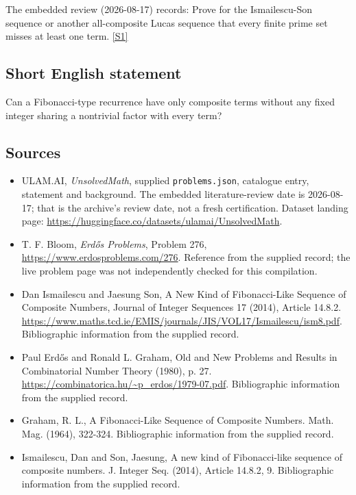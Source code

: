 \documentclass[11pt,a4paper]{article}
\newcommand{\sref}[2]{\hyperlink{source:#1:#2}{[S#2]}}
\begin{document}
The embedded review (2026-08-17) records: Prove for the Ismailescu-Son sequence or another all-composite Lucas sequence that every finite prime set misses at least one term. \sref{statement}{1}

\subsection{Short English statement}

Can a Fibonacci-type recurrence have only composite terms without any fixed integer sharing a nontrivial factor with every term?

\subsection{Sources}

{\small

\begin{itemize}

\item[\hypertarget{source:statement:1}{S1}] ULAM.AI, \emph{UnsolvedMath}, supplied \texttt{problems.json}, catalogue entry, statement and background. The embedded literature-review date is 2026-08-17; that is the archive’s review date, not a fresh certification. Dataset landing page: \url{https://huggingface.co/datasets/ulamai/UnsolvedMath}.

\item[\hypertarget{source:statement:2}{S2}] T. F. Bloom, \emph{Erdős Problems}, Problem 276, \url{https://www.erdosproblems.com/276}. Reference from the supplied record; the live problem page was not independently checked for this compilation.

\item[\hypertarget{source:statement:3}{S3}] Dan Ismailescu and Jaesung Son, A New Kind of Fibonacci-Like Sequence of Composite Numbers, Journal of Integer Sequences 17 (2014), Article 14.8.2. \url{https://www.maths.tcd.ie/EMIS/journals/JIS/VOL17/Ismailescu/ism8.pdf}. Bibliographic information from the supplied record.

\item[\hypertarget{source:statement:4}{S4}] Paul Erdős and Ronald L. Graham, Old and New Problems and Results in Combinatorial Number Theory (1980), p. 27. \url{https://combinatorica.hu/~p_erdos/1979-07.pdf}. Bibliographic information from the supplied record.

\item[\hypertarget{source:statement:5}{S5}] Graham, R. L., A Fibonacci-Like Sequence of Composite Numbers. Math. Mag. (1964), 322-324. Bibliographic information from the supplied record.

\item[\hypertarget{source:statement:6}{S6}] Ismailescu, Dan and Son, Jaesung, A new kind of {F}ibonacci-like sequence of composite numbers. J. Integer Seq. (2014), Article 14.8.2, 9. Bibliographic information from the supplied record.

\end{itemize}

}

\label{end:statement}
\end{document}
